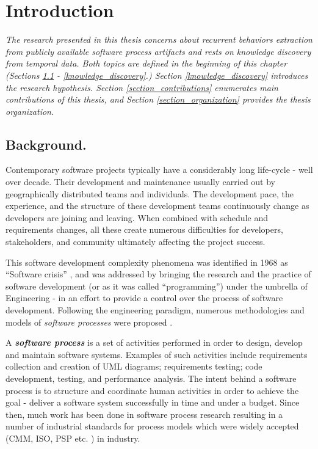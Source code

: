\chapter{Introduction}

\textit{The research presented in this thesis concerns about recurrent behaviors extraction from
publicly available software process artifacts and rests on knowledge discovery from temporal data. 
Both topics are defined in the beginning of this chapter 
(Sections \ref{section_background} - \ref{knowledge_discovery}.) 
Section \ref{knowledge_discovery} introduces the research hypothesis.
Section \ref{section_contributions} enumerates main contributions of this thesis,
and Section \ref{section_organization} provides the thesis organization.
}

\section{Background.}\label{section_background}
Contemporary software projects typically have a considerably long life-cycle - well over decade.
Their development and maintenance usually carried out by geographically distributed teams 
and individuals. The development pace, the experience, and the structure of these development 
teams continuously change as developers are joining and leaving. When combined with
schedule and requirements changes, all these create numerous difficulties 
for developers, stakeholders, and community ultimately affecting the project success. 

This software development complexity phenomena was identified in 1968 as ``Software crisis'' \cite{crisis}, 
and was addressed by bringing the research and the practice of software development 
(or as it was called ``programming'') under the umbrella of Engineering - in an effort to provide a 
control over the process of software development. 
Following the engineering paradigm, numerous methodologies and models of \textit{software processes}
were proposed \cite{citeulike:10002165}.

A \textbf{\textit{software process}} is a set of activities performed in order to design, develop and maintain 
software systems. Examples of such activities include requirements collection and creation of UML diagrams;
requirements testing; code development, testing, and performance analysis. 
The intent behind a software process is to structure and coordinate human activities in order to achieve 
the goal - deliver a software system successfully in time and under a budget.
Since then, much work has been done in software process research resulting in a number of industrial standards for 
process models which were widely accepted (CMM, ISO, PSP etc. \cite{citeulike:5043104}) in industry. 

